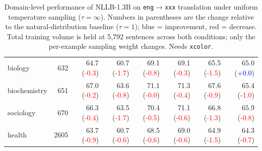 \begin{table}[t]
\begin{subtable}{\textwidth}
{\begin{tabular}{lrrrrrrr}
            biology & 632 & 64.7 (\textcolor{red}{-0.3}) & 60.7 (\textcolor{red}{-1.7}) & 69.1 (\textcolor{red}{-0.8}) & 69.1 (\textcolor{red}{-0.3}) & 65.5 (\textcolor{red}{-1.5}) & 65.0 (\textcolor{blue}{+0.0}) \\
            biochemistry & 651 & 67.0 (\textcolor{red}{-0.2}) & 63.6 (\textcolor{red}{-0.8}) & 71.1 (\textcolor{red}{-0.0}) & 71.3 (\textcolor{red}{-0.4}) & 67.6 (\textcolor{red}{-0.9}) & 65.4 (\textcolor{red}{-1.0}) \\
            sociology & 670 & 66.3 (\textcolor{red}{-0.4}) & 63.5 (\textcolor{red}{-1.7}) & 70.4 (\textcolor{red}{-0.5}) & 71.1 (\textcolor{red}{-0.6}) & 66.8 (\textcolor{red}{-1.3}) & 65.9 (\textcolor{red}{-0.8}) \\
            health & 2605 & 63.7 (\textcolor{red}{-0.9}) & 60.7 (\textcolor{red}{-0.6}) & 68.5 (\textcolor{red}{-0.6}) & 69.0 (\textcolor{red}{-0.6}) & 64.9 (\textcolor{red}{-1.5}) & 64.3 (\textcolor{red}{-0.7}) \\
        \bottomrule
        \end{tabular}
        }
        \caption{COMET}
    \end{subtable}
    \caption{Domain-level performance of NLLB-1.3B on \texttt{eng}$\to$\texttt{xxx} translation under uniform temperature sampling ($\tau{=}\infty$). Numbers in parentheses are the change relative to the natural-distribution baseline ($\tau{=}1$); blue = improvement, red = decrease. Total training volume is held at 5{,}792 sentences across both conditions; only the per-example sampling weight changes. Needs \texttt{xcolor}.}
    \label{tab:balance_domain_eng_xxx_dual}
\end{table}
